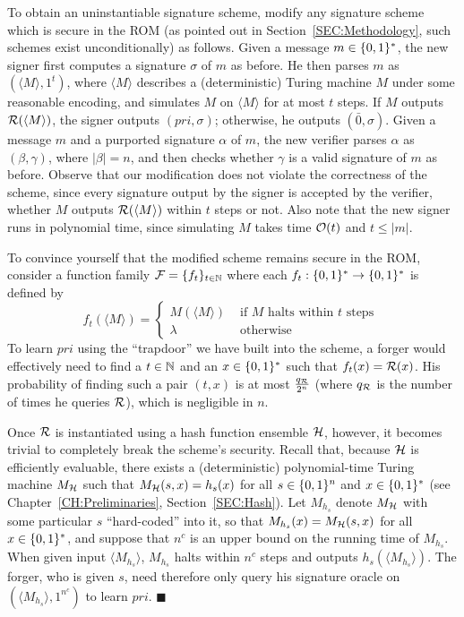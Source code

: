 To obtain an uninstantiable signature scheme, modify any signature scheme
which is secure in the ROM (as pointed out in
Section~\ref{SEC:Methodology}, such schemes exist unconditionally) as follows.
Given a message $m \in \{0,1\}^{*}$, the new signer first computes a signature
$\sigma$ of $m$ as before. He then parses $m$ as $(\langle M \rangle,1^t)$,
where $\langle M \rangle$ describes a (deterministic) Turing machine $M$ under
some reasonable encoding, and simulates $M$ on $\langle M \rangle$ for at most
$t$ steps. If $M$ outputs $\mathcal{R}(\langle M \rangle)$, the signer outputs
$(pri,\sigma)$; otherwise, he outputs $(\bar{0},\sigma)$.
Given a message $m$ and a purported signature $\alpha$ of $m$,
the new verifier parses $\alpha$ as $(\beta,\gamma)$, where $|\beta| =
n$, and then checks whether $\gamma$ is a valid signature of $m$ as before.
Observe that our modification does not violate the correctness of the scheme,
since every signature output by the signer is accepted by the verifier,
whether $M$ outputs $\mathcal{R}(\langle M \rangle)$ within $t$ steps or not. Also
note that the new signer runs in polynomial time, since simulating $M$ takes
time $\mathcal{O}(t)$ and $t \leq |m|$.

To convince yourself that the modified scheme remains secure in the ROM,
consider a function family $\mathcal{F} = \{f_t\}_{t \in \mathbb{N}}$ where each $f_t: \{0,1\}^{*} \to
\{0,1\}^{*}$ is defined by 
\begin{equation*}
f_t(\langle M \rangle) =
\begin{cases}
M(\langle M \rangle) & \text{ if $M$ halts within $t$ steps } \\
\lambda & \text{ otherwise}
\end{cases}
\end{equation*}
To learn $pri$ using the ``trapdoor'' we have built into the scheme, a forger
would effectively need to find a $t \in \mathbb{N}$ and an $x \in \{0,1\}^{*}$ such
that $f_t(x) = \mathcal{R}(x)$. His probability of finding such a pair $(t,x)$ is at
most $\frac{q_{\mathcal{R}}}{2^n}$ (where $q_{\mathcal{R}}$ is the number of times he queries
$\mathcal{R}$), which is negligible in $n$.

Once $\mathcal{R}$ is instantiated using a hash function ensemble $\mathcal{H}$, however,
it becomes trivial to completely break the scheme's security. Recall that,
because $\mathcal{H}$ is efficiently evaluable, there exists a (deterministic)
polynomial-time Turing machine $M_{\mathcal{H}}$ such that $M_{\mathcal{H}}(s,x) = h_s(x)$ for
all $s \in \{0,1\}^{n}$ and $x \in \{0,1\}^{*}$ (see Chapter~\ref{CH:Preliminaries},
Section~\ref{SEC:Hash}). Let $M_{h_s}$ denote $M_{\mathcal{H}}$ with some particular
$s$ ``hard-coded'' into it, so that $M_{h_s}(x) = M_{\mathcal{H}}(s,x)$ for all $x \in
\{0,1\}^{*}$, and suppose that $n^c$ is an upper bound on the running time of
$M_{h_s}$. When given input $\langle M_{h_s} \rangle$, $M_{h_s}$ halts within
$n^c$ steps and outputs $h_s(\langle M_{h_s} \rangle)$. The forger, who is
given $s$, need therefore only query his signature oracle on $(\langle M_{h_s}
\rangle, 1^{n^c})$ to learn $pri$. $\blacksquare$

